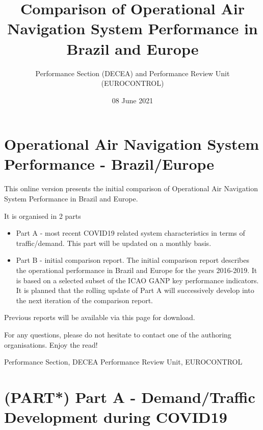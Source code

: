 \documentclass[
]{book}
\title{Comparison of Operational Air Navigation System Performance in Brazil and Europe}
\author{Performance Section (DECEA) and Performance Review Unit (EUROCONTROL)}
\date{08 June 2021}
\providecommand{\tightlist}{%
  \setlength{\itemsep}{0pt}\setlength{\parskip}{0pt}}
\begin{document}
\maketitle

{
\setcounter{tocdepth}{1}
\tableofcontents
}
\hypertarget{operational-air-navigation-system-performance---brazileurope}{%
\chapter*{\texorpdfstring{Operational Air Navigation System Performance - Brazil/Europe}{Operational Air Navigation System   Performance - Brazil/Europe}}\label{operational-air-navigation-system-performance---brazileurope}}

This online version presents the initial comparison of Operational Air Navigation System Performance in Brazil and Europe.

It is organised in 2 parts

\begin{itemize}
\tightlist
\item
  Part A - most recent COVID19 related system characteristics in terms of traffic/demand. This part will be updated on a monthly basis.
\item
  Part B - initial comparison report. The initial comparison report describes the operational performance in Brazil and Europe for the years 2016-2019. It is based on a selected subset of the ICAO GANP key performance indicators. It is planned that the rolling update of Part A will successively develop into the next iteration of the comparison report.
\end{itemize}

Previous reports will be available via this page for download.

For any questions, please do not hesitate to contact one of the authoring organisations.
Enjoy the read!

Performance Section, DECEA
Performance Review Unit, EUROCONTROL

\hypertarget{partA}{%
\chapter*{\texorpdfstring{(PART*) Part A - Demand/Traffic Development during COVID19}{(PART*) Part A - Demand/Traffic Development   during COVID19}}\label{partA}}
\end{document}
